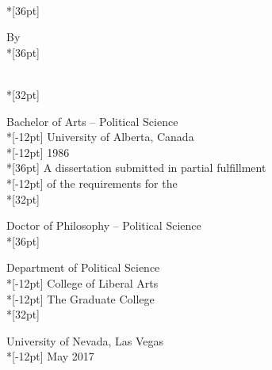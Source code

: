 \thispagestyle{empty}%

\begin{center}
 \TitleName\\*[36pt]

\normalsize By\\*[36pt]

 \AuthorName\\*[32pt] 

 Bachelor of Arts -- Political Science\\*[-12pt] 
 University of Alberta, Canada\\*[-12pt]
 1986\\*[36pt]
 A dissertation submitted in partial fulfillment\\*[-12pt]
 of the requirements for the\\*[32pt]

 Doctor of Philosophy -- Political Science\\*[36pt]
 
 Department of Political Science\\*[-12pt]
 College of Liberal Arts \\*[-12pt]
 The Graduate College\\*[32pt]

 University of Nevada, Las Vegas\\*[-12pt]
 May 2017
\end{center}

